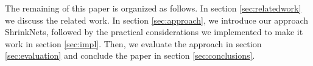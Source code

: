 The remaining of this paper is organized as follows. In section
\ref{sec:relatedwork} we discuss the related work. In section
\ref{sec:approach}, we introduce our approach ShrinkNets, followed by the
practical considerations we implemented to make it work in section
\ref{sec:impl}. Then, we evaluate the approach in section \ref{sec:evaluation}
and conclude the paper in section \ref{sec:conclusions}.


